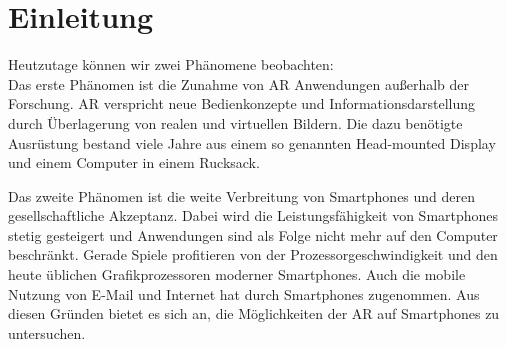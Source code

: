 \chapter{Einleitung} %
\label{cha:einleitung}

Heutzutage können wir zwei Phänomene beobachten:\\Das erste Phänomen ist die Zunahme von \gls{AR} Anwendungen außerhalb
 der Forschung. \gls{AR} verspricht neue Bedienkonzepte und Informationsdarstellung durch Überlagerung von realen und
 virtuellen Bil\-dern. Die dazu benötigte Ausrüstung bestand viele Jahre aus einem so genannten Head-mounted Display
 und einem Computer in einem Rucksack.

Das zweite Phänomen ist die weite Verbreitung von Smartphones und deren ge\-sell\-schaft\-liche Akzeptanz. Dabei wird
 die Leistungsfähigkeit von Smartphones stetig ge\-stei\-gert und Anwendungen sind als Folge nicht mehr auf den
 Computer beschränkt. Gerade Spiele profitieren von der Prozessor\-ge\-schwin\-dig\-keit und den heute üblichen
 Grafikprozessoren moderner Smartphones. Auch die mobile Nutzung von E-Mail und Internet hat durch Smartphones
 zugenommen. Aus diesen Gründen bietet es sich an, die Mög\-lich\-kei\-ten der \gls{AR} auf Smartphones zu untersuchen.





